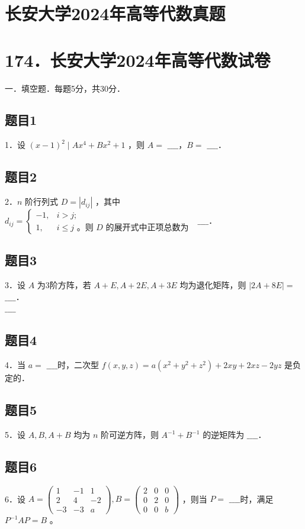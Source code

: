 \documentclass{article}
\begin{document}
\section*{长安大学2024年高等代数真题}
\section*{174．长安大学2024年高等代数试卷}
一．填空题．每题5分，共30分．\\

\subsection{题目1}
1．设 \((x-1)^{2} \mid A x^{4}+B x^{2}+1\) ，则 \(A=\) \(\_\_\_\_\)，\(B=\) \(\_\_\_\_\)．

\subsection{题目2}
2．\(n\) 阶行列式 \(D=\left|d_{i j}\right|\) ，其中 \(d_{i j}=\left\{\begin{array}{cc}-1, & i>j ; \\ 1, & i \leq j \text { 。则 } D \text { 的展开式中正项总数为 }\end{array}\right.\) \(\_\_\_\_\)．

\subsection{题目3}
3．设 \(A\) 为3阶方阵，若 \(A+E, A+2 E, A+3 E\) 均为退化矩阵，则 \(|2 A+8 E|=\) \(\_\_\_\_\)．\\
\(\_\_\_\_\)

\subsection{题目4}
4．当 \(a=\) \(\_\_\_\_\)时，二次型 \(f(x, y, z)=a\left(x^{2}+y^{2}+z^{2}\right)+2 x y+2 x z-2 y z\) 是负定的．

\subsection{题目5}
5．设 \(A, B, A+B\) 均为 \(n\) 阶可逆方阵，则 \(A^{-1}+B^{-1}\) 的逆矩阵为 \(\_\_\_\_\)．

\subsection{题目6}
6．设 \(A=\left(\begin{array}{ccc}1 & -1 & 1 \\ 2 & 4 & -2 \\ -3 & -3 & a\end{array}\right), B=\left(\begin{array}{lll}2 & 0 & 0 \\ 0 & 2 & 0 \\ 0 & 0 & b\end{array}\right)\) ，则当 \(P=\) \(\_\_\_\_\)时，满足 \(P^{-1} A P=B\) 。
\end{document}
